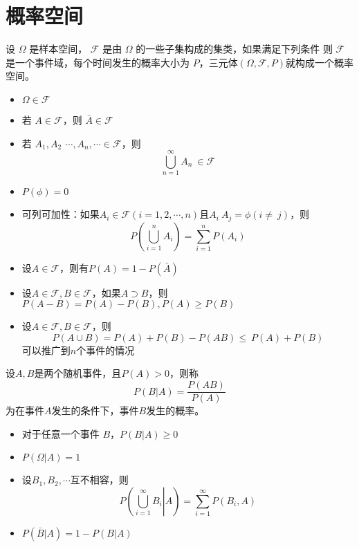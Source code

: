 \section{概率空间}

设 $\Omega$ 是样本空间， $\mathcal{F}$ 是由 $\Omega$ 的一些子集构成的集类，如果满足下列条件
则 $\mathcal{F}$ 是一个事件域，每个时间发生的概率大小为 $P$，三元体$(\Omega,\mathcal{F},P)$就构成一个概率空间。
\begin{itemize}[leftmargin=\paritemindent]
    \item $\Omega \in \mathcal{F}$
    \item 若 $A\in\mathcal{F}$，则 $\bar{A}\in\mathcal{F}$
    \item 若 $A_1,A_2\ \,\cdots,A_n,\cdots\in\mathcal{F}$，则
     $$ \bigcup_{n=1}^\infty A_n\ \in\mathcal{F} $$ 
\end{itemize}


\begin{itemize}[leftmargin=\paritemindent]
    \item $P(\phi)=0$
	\item 可列可加性：如果$A_i\in\mathcal{F}(i=1,2,\cdots,n)$且$A_i\ A_j=\phi(i\neq\ j)$，则
     $$ P\left(\bigcup_{i=1}^n A_i \right)=\sum_{i=1}^n P(A_i )  $$ 
    \item 设$A\in\mathcal{F}$，则有$P(A)=1-P(\bar{A})$
    \item 设$A\in\mathcal{F},B\in\mathcal{F}$，如果$A\supset B$，则$P(A-B)=P(A)-P(B),P(A)\geq P(B)$
    \item 设$A\in\mathcal{F},B\in\mathcal{F}$，则
     $$ P(A\cup B)=P(A)+P(B)-P(AB)\le\ P(A)+P(B) $$ 
    可以推广到$n$个事件的情况
\end{itemize}

 设$A,B$是两个随机事件，且$P(A)>0$，则称
\begin{equation}
    P(B | A)=\frac{P(AB)}{P(A)}
\end{equation}
为在事件$A$发生的条件下，事件$B$发生的概率。

\begin{itemize}[leftmargin=\paritemindent]
    \item 对于任意一个事件 $B$，$P(B|A) \geqslant 0$
    \item $P(\Omega | A)=1$
    \item 设$B_1,B_2,\cdots$互不相容，则 \begin{equation}
        P\left(\left. \bigcup_{i=1}^\infty B_i \right| A \right) = \sum_{i=1}^\infty P(B_i,A)
    \end{equation}
    \item $P(\bar{B} |A) = 1 - P(B|A)$
\end{itemize}

